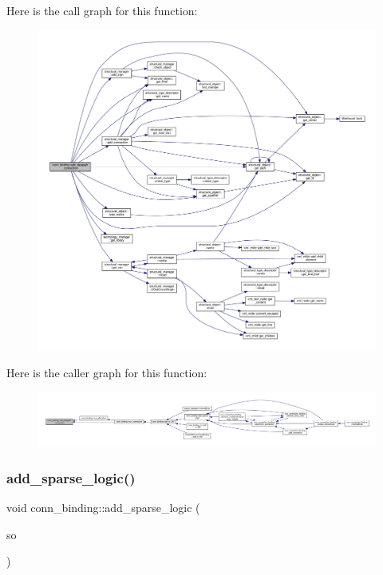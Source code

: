 Here is the call graph for this function\+:
\nopagebreak
\begin{figure}[H]
\begin{center}
\leavevmode
\includegraphics[width=350pt]{d2/db1/classconn__binding_a9b8d9e4a2740b3cef8f4242be0c06dda_cgraph}
\end{center}
\end{figure}
Here is the caller graph for this function\+:
\nopagebreak
\begin{figure}[H]
\begin{center}
\leavevmode
\includegraphics[width=350pt]{d2/db1/classconn__binding_a9b8d9e4a2740b3cef8f4242be0c06dda_icgraph}
\end{center}
\end{figure}
\mbox{\label{classconn__binding_ab42e47f8c1b558caf9029baed9c59705}} 
\subsubsection{\texorpdfstring{add\+\_\+sparse\+\_\+logic()}{add\_sparse\_logic()}}
{\footnotesize\ttfamily void conn\+\_\+binding\+::add\+\_\+sparse\+\_\+logic (\begin{DoxyParamCaption}\item[{const \hyperlink{generic__obj_8hpp_acb533b2ef8e0fe72e09a04d20904ca81}{generic\+\_\+obj\+Ref}}]{so }\end{DoxyParamCaption})\hspace{0.3cm}{\ttfamily [inline]}}



